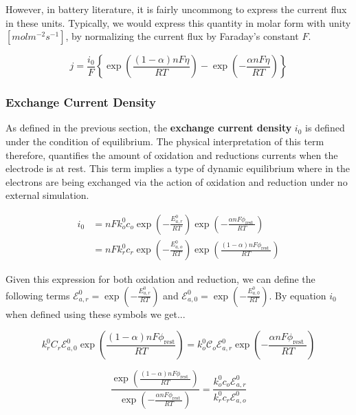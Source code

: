 \documentclass[lettersize,journal]{IEEEtran}
\begin{document}
\noindent However, in battery literature, it is fairly uncommong to express the current flux in these units. Typically, we would express this quantity in molar form with unity $\left[ mol m^{-2} s^{-1} \right]$, by normalizing the current flux by Faraday's constant $F$.


\begin{equation}
j=\frac{i_{0}}{F}\left\{\exp \left(\frac{(1-\alpha) n F \eta}{R T}\right)-\exp \left(-\frac{\alpha n F \eta}{R T}\right)\right\}
\end{equation}


\subsubsection{Exchange Current Density}
As defined in the previous section, the \textbf{exchange current density}  $i_0$ is defined under the condition of equilibrium. The physical interpretation of this term therefore, quantifies the amount of oxidation and reductions currents when the electrode is at rest. This term implies a type of dynamic equilibrium where in the electrons are being exchanged via the action of oxidation and reduction under no external simulation.

\begin{equation}
\begin{aligned}
i_{0} &=n F k_{o}^{0} c_{o} \exp \left(-\frac{E_{a, r}^{0}}{R T}\right) \exp \left(-\frac{\alpha n F \phi_{\text {rest }}}{R T}\right) \\
&=n F k_{r}^{0} c_{r} \exp \left(-\frac{E_{a, o}^{0}}{R T}\right) \exp \left(\frac{(1-\alpha) n F \phi_{\text {rest }}}{R T}\right)
\end{aligned}
\end{equation}


\noindent Given this expression for both oxidation and reduction, we can define the following terms $\mathscr{E}_{a, r}^{0}=\exp \left(-\frac{E_{a, r}^{0}}{R T}\right)$ and $ \mathscr{E}_{a, 0}^{0}=\exp \left(-\frac{E_{a, 0}^{0}}{R T}\right)$. By equation $i_0$ when defined using these symbols we get...


\begin{equation}
  k_{r}^{0} C_{r} \mathscr{E}_{a, 0}^{0} \exp \left(\frac{(1-\alpha) n F \phi_{\text {rest}}}{R T}\right) =k_{o}^{0} \mathcal{C}_{o} \mathscr{E}_{a, r}^{0} \exp \left(-\frac{\alpha n F \phi_{\text {rest }}}{R T}\right)
\end{equation}


\begin{equation}
  \frac{\exp \left(\frac{(1-\alpha) n F \phi_{\text {rest }}}{R T}\right)}{\exp \left(-\frac{\alpha n F \phi_{\text {rest }}}{R T}\right)} =\frac{k_{o}^{0} c_{o} \mathscr{E}_{a, r}^{0}}{k_{r}^{0} c_{r} \mathscr{E}_{a, o}^{0}}
\end{equation}
\end{document}

